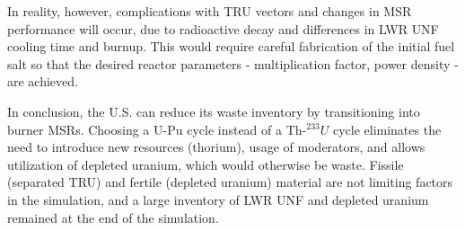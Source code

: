 In reality, however, complications with \gls{TRU} vectors and changes in \gls{MSR}
performance will occur, due to radioactive decay and differences in \gls{LWR} \gls{UNF}
cooling time and burnup. This would require careful fabrication of the initial fuel salt
so that the desired reactor parameters - multiplication factor, power density - are achieved.

In conclusion, the U.S. can reduce its waste inventory by transitioning into
burner \glspl{MSR}. Choosing a U-Pu cycle instead of a Th-$^{233}U$ cycle
eliminates the need to introduce new resources (thorium), usage of moderators,
and allows utilization of depleted uranium, which would otherwise be waste.
Fissile (separated \gls{TRU}) and fertile (depleted uranium) material are
not limiting factors in the simulation, and a large inventory of \gls{LWR} \gls{UNF}
and depleted uranium remained at the end of the simulation.
